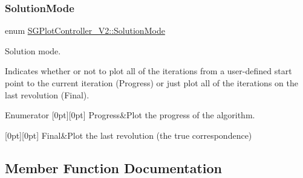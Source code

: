 \subsubsection{\texorpdfstring{Solution\+Mode}{SolutionMode}}
{\footnotesize\ttfamily enum \hyperlink{classSGPlotController__V2_a1a1b0d79a2202a7a5c7dd24ac8885677}{S\+G\+Plot\+Controller\+\_\+\+V2\+::\+Solution\+Mode}}



Solution mode. 

Indicates whether or not to plot all of the iterations from a user-\/defined start point to the current iteration (Progress) or just plot all of the iterations on the last revolution (Final). \begin{DoxyEnumFields}{Enumerator}
[0pt][0pt]{}\mbox{\label{classSGPlotController__V2_a1a1b0d79a2202a7a5c7dd24ac8885677af9627cbf5cd18f82785e0cfed31237e0}} 
Progress&Plot the progress of the algorithm. \\
\hline

[0pt][0pt]{}\mbox{\label{classSGPlotController__V2_a1a1b0d79a2202a7a5c7dd24ac8885677a5f2f2e1e7b99bd5d4117b80ca0fb2e01}} 
Final&Plot the last revolution (the true correspondence) \\
\hline

\end{DoxyEnumFields}


\subsection{Member Function Documentation}
\mbox{\label{classSGPlotController__V2_a12f98b7e96604eca6480dbdbf68151be}} 
